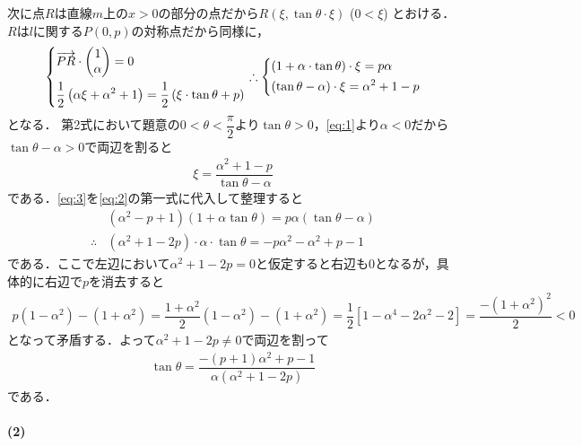 \documentclass[../../main.tex]{subfiles}
\begin{document}
次に点$R$は直線$m$上の$x>0$の部分の点だから$R(\xi, \tan\theta \cdot \xi)$ ($0 < \xi$) とおける．
$R$は$l$に関する$P(0,p)$の対称点だから同様に，
\begin{align}
  \begin{dcases}
    \overrightarrow{PR} \cdot
    \begin{pmatrix} 1 \\ \alpha
    \end{pmatrix} = 0 \\
    \dfrac{1}{2}\left(\alpha \xi + \alpha^2 +1\right) = \dfrac{1}{2}\left(\xi \cdot \tan\theta + p\right)
  \end{dcases}
  \therefore
  \begin{dcases}
    (1 + \alpha \cdot \tan\theta) \cdot \xi = p\alpha \\
    (\tan\theta - \alpha) \cdot \xi = \alpha^2 + 1 - p
  \end{dcases} \label{eq:2}
\end{align}
となる．
第2式において題意の$0<\theta<\dfrac{\pi}{2}$より$\tan\theta>0$，\cref{eq:1}より$\alpha<0$だから$\tan\theta - \alpha>0$で両辺を割ると
\begin{align}
  \xi = \dfrac{\alpha^2 + 1 - p}{\tan\theta - \alpha} \label{eq:3}
\end{align}
である．\cref{eq:3}を\cref{eq:2}の第一式に代入して整理すると
\begin{align}
  & (\alpha^2 - p + 1)(1 + \alpha \tan\theta) = p\alpha(\tan\theta - \alpha) \\
  \therefore
  & (\alpha^2 + 1 - 2p)\cdot \alpha \cdot \tan\theta = - p\alpha^2 - \alpha^2 + p - 1
\end{align}
である．ここで左辺において$\alpha^2 + 1 - 2p=0$と仮定すると右辺も$0$となるが，具体的に右辺で$p$を消去すると
\begin{align}
  p(1-\alpha^2)  - (1+\alpha^2)
  = \dfrac{1+\alpha^2}{2}(1-\alpha^2) - (1+\alpha^2)
  = \dfrac{1}{2}\left[1-\alpha^4 - 2\alpha^2-2\right]
  = \dfrac{-(1+\alpha^2)^2}{2}<0
\end{align}
となって矛盾する．よって$\alpha^2 + 1 - 2p\neq 0$で両辺を割って
\begin{align}
  \tan\theta = \dfrac{-(p+1)\alpha^2 + p - 1}{\alpha(\alpha^2 + 1 - 2p)} \label{eq:4}
\end{align}
である．

\paragraph{(2)}
\end{document}
